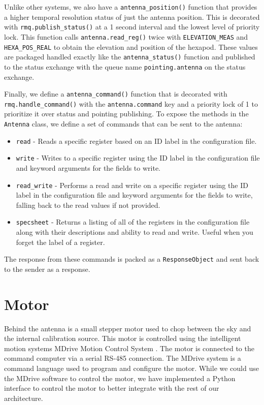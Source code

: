 Unlike other systems, we also have a \texttt{antenna\_position()} function that provides a higher temporal resolution status of just the antenna position.
This is decorated with \texttt{rmq.publish\_status()} at a 1 second interval and the lowest level of priority lock.
This function calls \texttt{antenna.read\_reg()} twice with \texttt{ELEVATION\_MEAS} and \texttt{HEXA\_POS\_REAL} to obtain the elevation and position of the hexapod. 
These values are packaged handled exactly like the \texttt{antenna\_status()} function and published to the status exchange with the queue name \texttt{pointing.antenna} on the status exchange.

Finally, we define a \texttt{antenna\_command()} function that is decorated with \texttt{rmq.handle\_command()} with the \texttt{antenna.command} key and a priority lock of 1 to prioritize it over status and pointing publishing. 
To expose the methods in the \texttt{Antenna} class, we define a set of commands that can be sent to the antenna: 
\begin{itemize}
    \item \texttt{read} - Reads a specific register based on an ID label in the configuration file.
    \item \texttt{write} - Writes to a specific register using the ID label in the configuration file and keyword arguments for the fields to write.
    \item \texttt{read\_write} - Performs a read and write on a specific register using the ID label in the configuration file and keyword arguments for the fields to write, falling back to the read values if not provided.
    \item \texttt{specsheet} - Returns a listing of all of the registers in the configuration file along with their descriptions and ability to read and write. Useful when you forget the label of a register.
\end{itemize}
The response from these commands is packed as a \texttt{ResponseObject} and sent back to the sender as a response.

\section{Motor}
Behind the antenna is a small stepper motor used to chop between the sky and the internal calibration source.
This motor is controlled using the intelligent motion systems MDrive Motion Control System \parencite{mdrive}.
The motor is connected to the command computer via a serial RS-485 connection. 
The MDrive system is a command language used to program and configure the motor.
While we could use the MDrive software to control the motor, we have implemented a Python interface to control the motor to better integrate with the rest of our architecture. 

